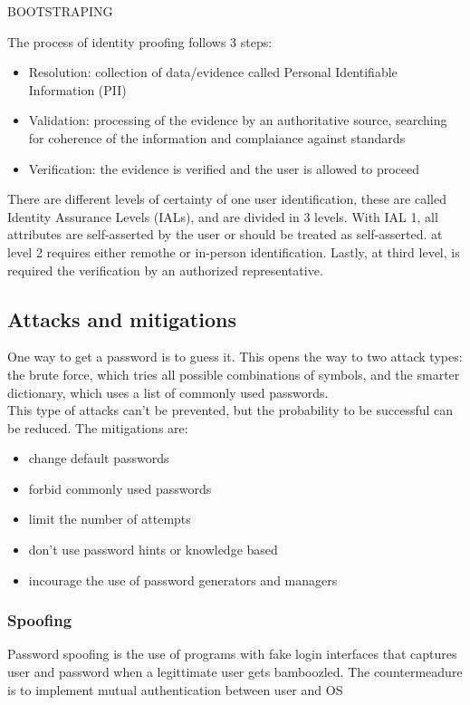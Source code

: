 \documentclass[12pt, a4paper]{article}
\begin{document}
BOOTSTRAPING

The process of identity proofing follows 3 steps:
\begin{itemize}
    \item Resolution: collection of data/evidence called Personal Identifiable Information (PII)
    \item Validation: processing of the evidence by an authoritative source, searching for coherence of the information and 
    complaiance against standards
    \item Verification: the evidence is verified and the user is allowed to proceed
\end{itemize}
There are different levels of certainty of one user identification, these are called Identity Assurance Levels (IALs), and 
are divided in 3 levels. With IAL 1, all attributes are self-asserted by the user or should be treated as self-asserted.
at level 2 requires either remothe or in-person identification. Lastly, at third level, is required the verification by
an authorized representative.

\subsection{Attacks and mitigations}
One way to get a password is to guess it. This opens the way to two attack types: the brute force, which tries all possible 
combinations of symbols, and the smarter dictionary, which uses a list of commonly used passwords.\\This type of attacks
can't be prevented, but the probability to be successful can be reduced. The mitigations are:
\begin{itemize}
    \item change default passwords
    \item forbid commonly used passwords
    \item limit the number of attempts
    \item don't use password hints or knowledge based
    \item incourage the use of password generators and managers
\end{itemize}

\subsubsection*{Spoofing}
Password spoofing is the use of programs with fake login interfaces that captures user and password when a legittimate user 
gets bamboozled. The countermeadure is to implement mutual authentication between user and OS
\end{document}
